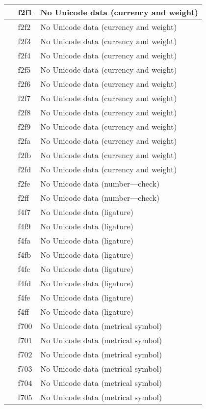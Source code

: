 \documentclass[12pt,letterpaper,openany]{book}
\begin{document}
\begin{center}
\begin{supertabular}{|m{0.25in}|m{0.5in}|m{4in}|}
			 & f2f1 & No Unicode data (currency and weight)\\\hline
			 & f2f2 & No Unicode data (currency and weight)\\\hline
			 & f2f3 & No Unicode data (currency and weight)\\\hline
			 & f2f4 & No Unicode data (currency and weight)\\\hline
			 & f2f5 & No Unicode data (currency and weight)\\\hline
			 & f2f6 & No Unicode data (currency and weight)\\\hline
			 & f2f7 & No Unicode data (currency and weight)\\\hline
			 & f2f8 & No Unicode data (currency and weight)\\\hline
			 & f2f9 & No Unicode data (currency and weight)\\\hline
			 & f2fa & No Unicode data (currency and weight)\\\hline
			 & f2fb & No Unicode data (currency and weight)\\\hline
			 & f2fd & No Unicode data (currency and weight)\\\hline
			 & f2fe & No Unicode data (number---check)\\\hline
			 & f2ff & No Unicode data (number---check)\\\hline
			 & f4f7 & No Unicode data (ligature)\\\hline
			 & f4f9 & No Unicode data (ligature)\\\hline
			 & f4fa & No Unicode data (ligature)\\\hline
			 & f4fb & No Unicode data (ligature)\\\hline
			 & f4fc & No Unicode data (ligature)\\\hline
			 & f4fd & No Unicode data (ligature)\\\hline
			 & f4fe & No Unicode data (ligature)\\\hline
			 & f4ff & No Unicode data (ligature)\\\hline
			 & f700 & No Unicode data (metrical symbol)\\\hline
			 & f701 & No Unicode data (metrical symbol)\\\hline
			 & f702 & No Unicode data (metrical symbol)\\\hline
			 & f703 & No Unicode data (metrical symbol)\\\hline
			 & f704 & No Unicode data (metrical symbol)\\\hline
			 & f705 & No Unicode data (metrical symbol)\\\hline

\end{supertabular}
\end{center}
\end{document}
